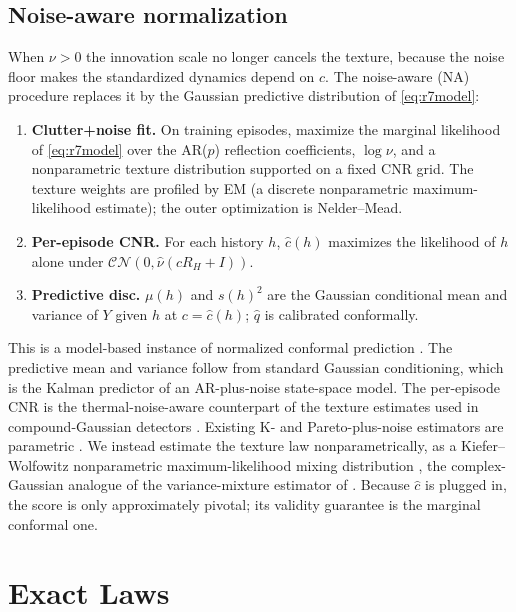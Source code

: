 \documentclass[journal]{IEEEtran}
\begin{document}
\subsection{Noise-aware normalization}
When $\nu>0$ the innovation scale no longer cancels the texture, because the noise floor makes the standardized dynamics depend on $c$. The noise-aware (NA) procedure replaces it by the Gaussian predictive distribution of \eqref{eq:r7model}:
\begin{enumerate}[leftmargin=*,itemsep=2pt]
\item \textbf{Clutter+noise fit.} On training episodes, maximize the marginal likelihood of \eqref{eq:r7model} over the AR($p$) reflection coefficients, $\log\nu$, and a nonparametric texture distribution supported on a fixed CNR grid. The texture weights are profiled by EM (a discrete nonparametric maximum-likelihood estimate); the outer optimization is Nelder--Mead.
\item \textbf{Per-episode CNR.} For each history $h$, $\widehat c(h)$ maximizes the likelihood of $h$ alone under $\mathcal{CN}(0,\widehat\nu(cR_H+I))$.
\item \textbf{Predictive disc.} $\mu(h)$ and $s(h)^2$ are the Gaussian conditional mean and variance of $Y$ given $h$ at $c=\widehat c(h)$; $\widehat q$ is calibrated conformally.
\end{enumerate}
This is a model-based instance of normalized conformal prediction \cite{dewolf2025}. The predictive mean and variance follow from standard Gaussian conditioning, which is the Kalman predictor of an AR-plus-noise state-space model. The per-episode CNR is the thermal-noise-aware counterpart of the texture estimates used in compound-Gaussian detectors \cite{greco2001,gini2002}. Existing K- and Pareto-plus-noise estimators are parametric \cite{watts1987,bocquet2015,mezache2016}. We instead estimate the texture law nonparametrically, as a Kiefer--Wolfowitz nonparametric maximum-likelihood mixing distribution \cite{kiefer1956,laird1978,koenker2014}, the complex-Gaussian analogue of the variance-mixture estimator of \cite{ignatiadis2025}. Because $\widehat c$ is plugged in, the score is only approximately pivotal; its validity guarantee is the marginal conformal one.

\section{Exact Laws}
\end{document}
